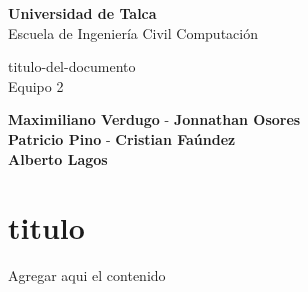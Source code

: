 \documentclass[12pt,letterpaper]{article}
\begin{document}
\setlength{\unitlength}{1 cm} %
\thispagestyle{empty}

\begin{flushleft}
\textbf{Universidad de Talca}\\
Escuela de Ingeniería Civil Computación\\
\end{flushleft}
\begin{center}
	\Huge{titulo-del-documento}\\
	\small{Equipo 2}
\end{center}
\begin{flushright}
	\textbf{Maximiliano Verdugo} - \textbf{Jonnathan Osores}\\
	\textbf{Patricio Pino} - \textbf{Cristian Faúndez}\\ 
	\textbf{Alberto Lagos}
\end{flushright}
\section*{titulo}
Agregar aqui el contenido
\newpage
\end{document}
